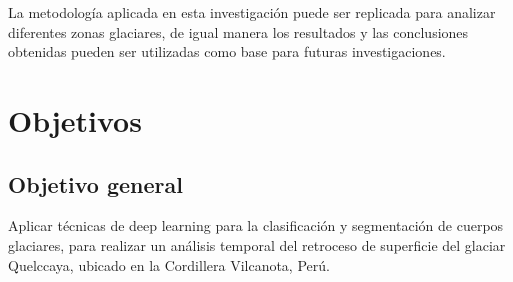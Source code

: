 La metodología aplicada en esta investigación puede ser replicada para analizar diferentes zonas glaciares, de igual manera los resultados y las conclusiones obtenidas pueden ser utilizadas como base para futuras investigaciones.


\section{Objetivos}
	\subsection{Objetivo general}
	
	Aplicar técnicas de deep learning para la clasificación y segmentación de cuerpos glaciares, para realizar un análisis temporal del retroceso de superficie del glaciar Quelccaya, ubicado en la Cordillera Vilcanota, Perú.
	
